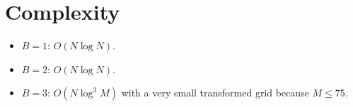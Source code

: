 \documentclass[11pt,a4paper]{article}
\begin{document}
\section{Complexity}
\begin{itemize}
  \item $B=1$: $O(N \log N)$.
  \item $B=2$: $O(N \log N)$.
  \item $B=3$: $O(N \log^3 M)$ with a very small transformed grid because $M \le 75$.
\end{itemize}
\end{document}
